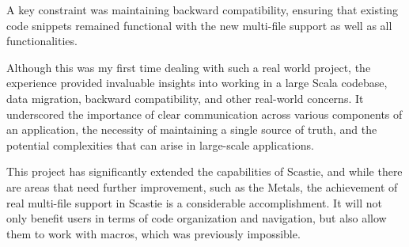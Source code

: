 \documentclass[a4paper,11pt,oneside]{report}
\begin{document}
A key constraint was maintaining backward compatibility, ensuring that existing code snippets remained functional with the new multi-file support as well as all functionalities.

Although this was my first time dealing with such a real world project, the experience provided invaluable insights into working in a large Scala codebase, data migration, backward compatibility, and other real-world concerns. It underscored the importance of clear communication across various components of an application, the necessity of maintaining a single source of truth, and the potential complexities that can arise in large-scale applications.

This project has significantly extended the capabilities of Scastie, and while there are areas that need further improvement, such as the Metals, the achievement of real multi-file support in Scastie is a considerable accomplishment. It will not only benefit users in terms of code organization and navigation, but also allow them to work with macros, which was previously impossible.

\cleardoublepage
{}
{}
\printbibliography

%
%
\end{document}
